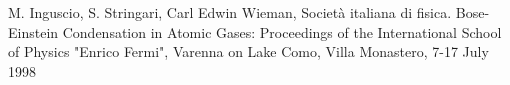 \documentclass[onecolumn,a4paper,10pt,plain]{article}
\begin{document}
\small
\begin{thebibliography}{99}
\setlength{\itemsep}{0pt}
\setlength{\parskip}{0pt}  %
 M. Inguscio, S. Stringari, Carl Edwin Wieman, Società italiana di fisica. Bose-Einstein Condensation in Atomic Gases: Proceedings of the International School of Physics "Enrico Fermi", Varenna on Lake Como, Villa Monastero, 7-17 July 1998

\end{thebibliography}
\end{document}
